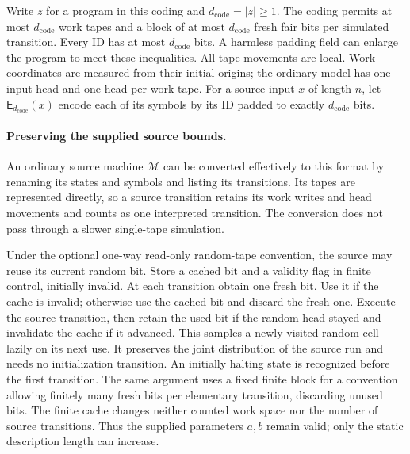 \documentclass[11pt]{article}
\numberwithin{equation}{section}
\theoremstyle{definition}
\theoremstyle{remark}
\begin{document}
Write $z$ for a program in this coding and
$d_{\mathrm{code}}=|z|\ge1$.  The coding permits at most
$d_{\mathrm{code}}$ work tapes and a block of at most
$d_{\mathrm{code}}$ fresh fair bits per simulated transition.  Every ID
has at most $d_{\mathrm{code}}$ bits.  A harmless padding field can enlarge
the program to meet these inequalities.  All tape movements are local.
Work coordinates are measured from their initial origins; the ordinary
model has one input head and one head per work tape.  For a source input
$x$ of length $n$, let ${\mathsf{E}}_{d_{\mathrm{code}}}(x)$ encode each of its
symbols by its ID padded to exactly $d_{\mathrm{code}}$ bits.

\paragraph{Preserving the supplied source bounds.}
An ordinary source machine ${\mathcal{M}}$ can be converted effectively to this format
by renaming its states and symbols and listing its transitions.  Its tapes
are represented directly, so a source transition retains its work writes
and head movements and counts as one interpreted transition.  The
conversion does not pass through a slower single-tape simulation.

Under the optional one-way read-only random-tape convention, the source
may reuse its current random bit. Store a cached bit and a validity flag
in finite control, initially invalid.
At each transition obtain one fresh bit.  Use it if the cache is invalid;
otherwise use the cached bit and discard the fresh one.  Execute the
source transition, then retain the used bit if the random head stayed
and invalidate the cache if it advanced.  This samples a newly visited
random cell lazily on its next use.  It preserves the joint distribution
of the source run and needs no initialization transition.  An initially
halting state is recognized before the first transition.  The same
argument uses a fixed finite block for a convention allowing finitely
many fresh bits per elementary transition, discarding unused bits.
The finite cache changes neither counted work space nor the number of
source transitions.  Thus the supplied parameters $a,b$ remain valid;
only the static description length can increase.
\end{document}
